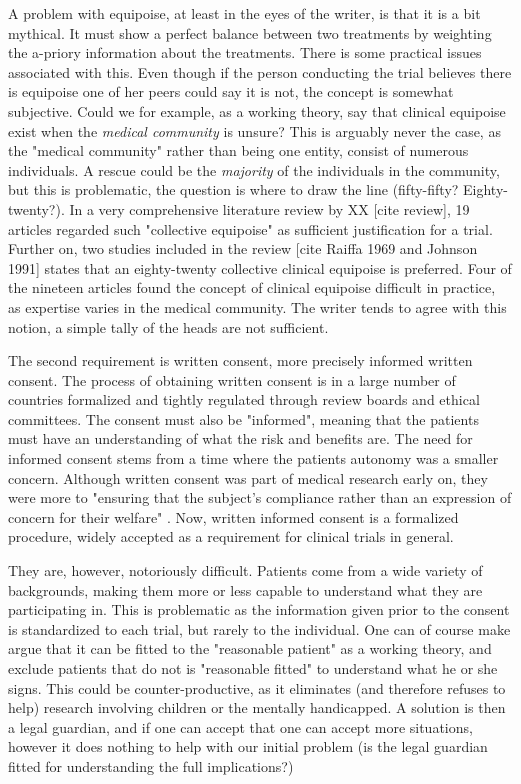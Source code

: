 \documentclass[12p]{article}
\begin{document}
A problem with equipoise, at least in the eyes of the writer, is that it is a bit mythical.
It must show a perfect balance between two treatments by weighting the a-priory information about the treatments.
There is some practical issues associated with this.
Even though if the person conducting the trial believes there is equipoise one of her peers could say it is not, the concept is somewhat subjective.
Could we for example, as a working theory, say that clinical equipoise exist when the \emph{medical community} is unsure?
This is arguably never the case, as the "medical community" rather than being one entity, consist of numerous individuals.
A rescue could be the \emph{majority} of the individuals in the community, but this is problematic, the question is where to draw the line (fifty-fifty? Eighty-twenty?).
In a very comprehensive literature review by XX [cite review], 19 articles regarded such "collective equipoise" as sufficient justification for a trial.
Further on, two studies included in the review [cite Raiffa 1969 and Johnson 1991] states that an eighty-twenty collective clinical equipoise is preferred.
Four of the nineteen articles found the concept of clinical equipoise difficult in practice, as expertise varies in the medical community.
The writer tends to agree with this notion, a simple tally of the heads are not sufficient.

The second requirement is written consent, more precisely informed written consent.
The process of obtaining written consent is in a large number of countries formalized and tightly regulated through review boards and ethical committees.
The consent must also be "informed", meaning that the patients must have an understanding of what the risk and benefits are.
The need for informed consent stems from a time where the patients autonomy was a smaller concern.
Although written consent was part of medical research early on, they were more to "ensuring that the subject's compliance rather than an expression of concern for their welfare" \cite{nadineth}.
Now, written informed consent is a formalized procedure, widely accepted as a requirement for clinical trials in general.

They are, however, notoriously difficult.
Patients come from a wide variety of backgrounds, making them more or less capable to understand what they are participating in.
This is problematic as the information given prior to the consent is standardized to each trial, but rarely to the individual.
One can of course make argue that it can be fitted to the "reasonable patient" as a working theory, and exclude patients that do not is "reasonable fitted" to understand what he or she signs.
This could be counter-productive, as it eliminates (and therefore refuses to help) research involving children or the mentally handicapped.
A solution is then a legal guardian, and if one can accept that one can accept more situations, however it does nothing to help with our initial problem (is the legal guardian fitted for understanding the full implications?)
\end{document}
